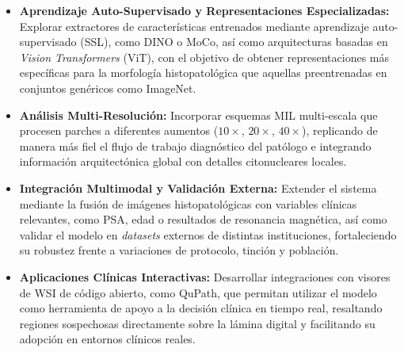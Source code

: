 \begin{itemize}

    \item \textbf{Aprendizaje Auto-Supervisado y Representaciones Especializadas:}  
    Explorar extractores de características entrenados mediante aprendizaje auto-supervisado (SSL), como DINO o MoCo, así como arquitecturas basadas en \textit{Vision Transformers} (ViT), con el objetivo de obtener representaciones más específicas para la morfología histopatológica que aquellas preentrenadas en conjuntos genéricos como ImageNet.

    \item \textbf{Análisis Multi-Resolución:}  
    Incorporar esquemas MIL multi-escala que procesen parches a diferentes aumentos ($10\times$, $20\times$, $40\times$), replicando de manera más fiel el flujo de trabajo diagnóstico del patólogo e integrando información arquitectónica global con detalles citonucleares locales.

    \item \textbf{Integración Multimodal y Validación Externa:}  
    Extender el sistema mediante la fusión de imágenes histopatológicas con variables clínicas relevantes, como PSA, edad o resultados de resonancia magnética, así como validar el modelo en \textit{datasets} externos de distintas instituciones, fortaleciendo su robustez frente a variaciones de protocolo, tinción y población.

    \item \textbf{Aplicaciones Clínicas Interactivas:}  
    Desarrollar integraciones con visores de WSI de código abierto, como QuPath, que permitan utilizar el modelo como herramienta de apoyo a la decisión clínica en tiempo real, resaltando regiones sospechosas directamente sobre la lámina digital y facilitando su adopción en entornos clínicos reales.

\end{itemize}
